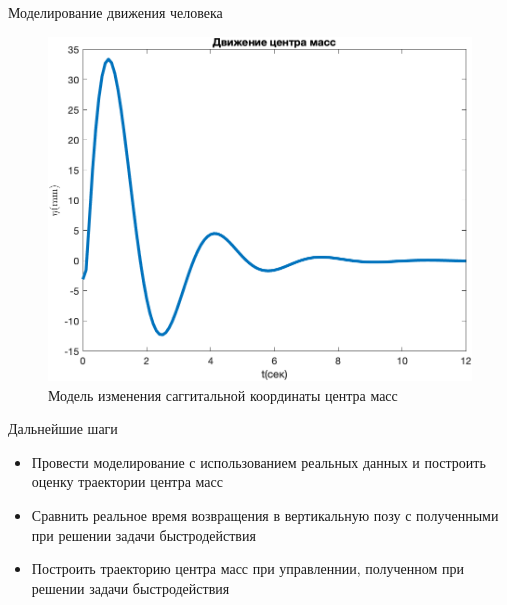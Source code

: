 \documentclass[10pt]{beamer}
\begin{document}
\begin{frame}{Моделирование движения человека}
	\begin{figure}[h!]
		\includegraphics[width=0.7\linewidth]{images/center_mass_my.png}
		\caption{Модель изменения саггитальной координаты центра масс}
	\end{figure}
\end{frame}

\begin{frame}{Дальнейшие шаги}
	\begin{itemize}
		\item Провести моделирование с использованием реальных данных и построить оценку траектории центра масс
		\item Сравнить реальное время возвращения в вертикальную позу с полученными при решении задачи быстродействия
		\item Построить траекторию центра масс при управленнии, полученном при решении задачи быстродействия
	  \end{itemize}
	
\end{frame}
\end{document}

